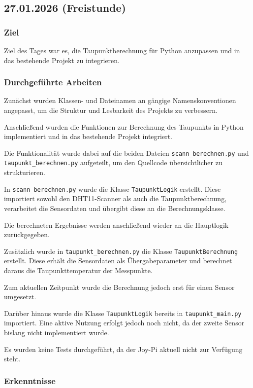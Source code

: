 \subsection{27.01.2026 (Freistunde)}

\subsubsection{Ziel}

Ziel des Tages war es, die Taupunktberechnung für Python
anzupassen und in das bestehende Projekt zu integrieren.

\subsubsection{Durchgeführte Arbeiten}

Zunächst wurden Klassen- und Dateinamen an gängige
Namenskonventionen angepasst, um die Struktur und
Lesbarkeit des Projekts zu verbessern.

Anschließend wurden die Funktionen zur Berechnung des
Taupunkts in Python implementiert und in das bestehende
Projekt integriert.

Die Funktionalität wurde dabei auf die beiden Dateien
\texttt{scann\_berechnen.py} und
\texttt{taupunkt\_berechnen.py} aufgeteilt,
um den Quellcode übersichtlicher zu strukturieren.

In \texttt{scann\_berechnen.py} wurde die Klasse
\texttt{TaupunktLogik} erstellt.
Diese importiert sowohl den DHT11-Scanner als auch die
Taupunktberechnung, verarbeitet die Sensordaten und
übergibt diese an die Berechnungsklasse.

Die berechneten Ergebnisse werden anschließend wieder
an die Hauptlogik zurückgegeben.

Zusätzlich wurde in
\texttt{taupunkt\_berechnen.py} die Klasse
\texttt{TaupunktBerechnung} erstellt.
Diese erhält die Sensordaten als Übergabeparameter und
berechnet daraus die Taupunkttemperatur der Messpunkte.

Zum aktuellen Zeitpunkt wurde die Berechnung jedoch erst
für einen Sensor umgesetzt.

Darüber hinaus wurde die Klasse
\texttt{TaupunktLogik} bereits in
\texttt{taupunkt\_main.py} importiert.
Eine aktive Nutzung erfolgt jedoch noch nicht, da der
zweite Sensor bislang nicht implementiert wurde.

Es wurden keine Tests durchgeführt, da der Joy-Pi aktuell nicht zur Verfügung steht.

\subsubsection{Erkenntnisse}

